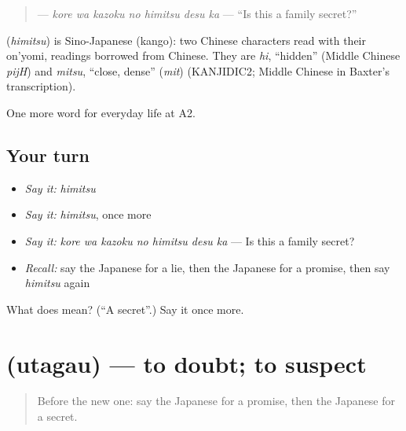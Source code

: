 \begin{quote}
\textbf{  } — \emph{kore wa kazoku no himitsu desu ka} — \textquotedblleft{}Is this a family secret?\textquotedblright{}
\end{quote}

\begin{cousinweb}
\textbf{} (\emph{himitsu}) is Sino-Japanese (kango): two Chinese characters read with their on'yomi, readings borrowed from Chinese. They are \emph{hi}, \textquotedblleft{}hidden\textquotedblright{} (Middle Chinese \emph{pijH}) and \emph{mitsu}, \textquotedblleft{}close, dense\textquotedblright{} (\emph{mit}) (KANJIDIC2; Middle Chinese in Baxter's transcription).
\end{cousinweb}

\begin{grammarlens}[title={What you've built}]
One more word for everyday life at A2.
\end{grammarlens}

\subsection*{Your turn}
\begin{itemize}
\raggedright
  \item \emph{Say it:} \emph{himitsu}
  \item \emph{Say it:} \emph{himitsu}, once more
  \item \emph{Say it:} \emph{kore wa kazoku no himitsu desu ka} — Is this a family secret?
  \item \emph{Recall:} say the Japanese for a lie, then the Japanese for a promise, then say \emph{himitsu} again
\end{itemize}

\begin{tcolorbox}[breakable,colback=teal!4,colframe=teal!35!black,title={Before you move on}]
What does  mean? (\textquotedblleft{}A secret\textquotedblright{}.) Say it once more.
\end{tcolorbox}
\section[\texorpdfstring{\ja{うたがう} (utagau)}{うたがう (utagau)}]{ (utagau) — to doubt; to suspect}

\label{lesson:JA-C248-utagau}



\begin{quote}
Before the new one: say the Japanese for a promise, then the Japanese for a secret.
\end{quote}

